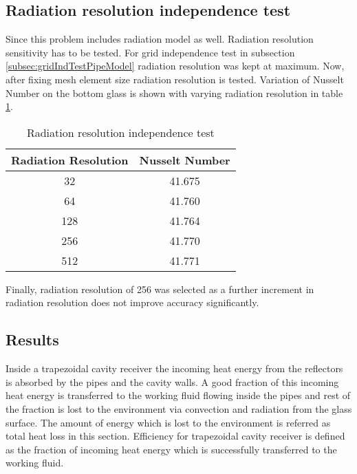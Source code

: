 \subsection{Radiation resolution independence test}
Since this problem includes radiation model as well. Radiation resolution sensitivity has to be tested. For grid independence test in subsection \ref{subsec:gridIndTestPipeModel} radiation resolution was kept at maximum. Now, after fixing mesh element size radiation resolution is tested. Variation of Nusselt Number on the bottom glass is shown with varying radiation resolution in table \ref{tab:radResolutionIndTest}.

\begin{table}[H]
\centering
\caption{Radiation resolution independence test}
\label{tab:radResolutionIndTest}
\begin{tabular}{@{}|c|c|@{}}
\toprule
\textbf{Radiation Resolution} & \textbf{Nusselt Number} \\ \midrule
32                            & 41.675                  \\ \midrule
64                            & 41.760                  \\ \midrule
128                           & 41.764                  \\ \midrule
256                           & 41.770                  \\ \midrule
512                           & 41.771                  \\ \bottomrule
\end{tabular}
\end{table}

Finally, radiation resolution of 256 was selected as a further increment in radiation resolution does not improve accuracy significantly.

\subsection{Results}
Inside a trapezoidal cavity receiver the incoming heat energy from the reflectors is absorbed by the pipes and the cavity walls. A good fraction of this incoming heat energy is transferred to the working fluid flowing inside the pipes and rest of the fraction is lost to the environment via convection and radiation from the glass surface. The amount of energy which is lost to the environment is referred as total heat loss in this section. Efficiency for trapezoidal cavity receiver is defined as the fraction of incoming heat energy which is successfully transferred to the working fluid.

